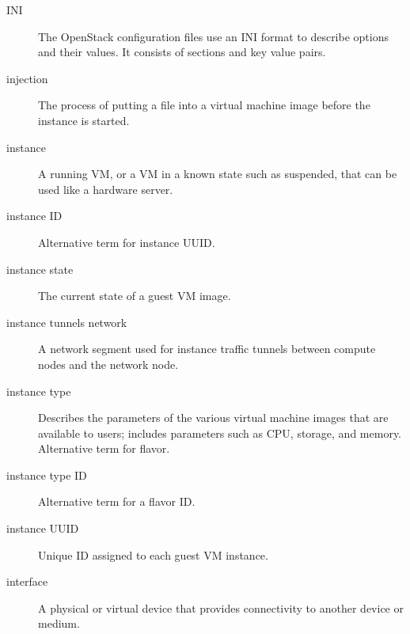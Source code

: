 \documentclass[letterpaper,10pt,english]{sphinxmanual}
\begin{document}
\begin{description}
\item[{INI}] \leavevmode{}\label{_source/glossary:term-ini}
The OpenStack configuration files use an INI format to
describe options and their values. It consists of sections
and key value pairs.

\item[{injection}] \leavevmode{}\label{_source/glossary:term-injection}
The process of putting a file into a virtual machine image
before the instance is started.

\item[{instance}] \leavevmode{}\label{_source/glossary:term-instance}
A running VM, or a VM in a known state such as suspended, that
can be used like a hardware server.

\item[{instance ID}] \leavevmode{}\label{_source/glossary:term-instance-id}
Alternative term for instance UUID.

\item[{instance state}] \leavevmode{}\label{_source/glossary:term-instance-state}
The current state of a guest VM image.

\item[{instance tunnels network}] \leavevmode{}\label{_source/glossary:term-instance-tunnels-network}
A network segment used for instance traffic tunnels
between compute nodes and the network node.

\item[{instance type}] \leavevmode{}\label{_source/glossary:term-instance-type}
Describes the parameters of the various virtual machine images
that are available to users; includes parameters such as CPU, storage,
and memory. Alternative term for flavor.

\item[{instance type ID}] \leavevmode{}\label{_source/glossary:term-instance-type-id}
Alternative term for a flavor ID.

\item[{instance UUID}] \leavevmode{}\label{_source/glossary:term-instance-uuid}
Unique ID assigned to each guest VM instance.

\item[{interface}] \leavevmode{}\label{_source/glossary:term-interface}
A physical or virtual device that provides connectivity
to another device or medium.


\end{description}
\end{document}
